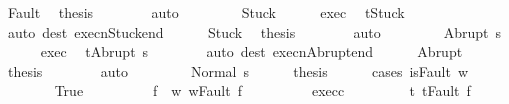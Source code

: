 \begin{isabellebody}
\ Fault\ \isamarkupfalse%
\ {\isacharquery}thesis\isanewline
\ \ \ \ \ \ \isamarkupfalse%
\ auto\isanewline
\ \ \isamarkupfalse%
\isanewline
\ \ \ \ \isamarkupfalse%
\ Stuck\isanewline
\ \ \ \ \isamarkupfalse%
\ exec\ \isamarkupfalse%
\ {\isachardoublequoteopen}t{\isacharequal}Stuck{\isachardoublequoteclose}\isanewline
\ \ \ \ \ \ \isamarkupfalse%
\ {\isacharparenleft}auto\ dest{\isacharcolon}\ execn{\isacharunderscore}Stuck{\isacharunderscore}end{\isacharparenright}\isanewline
\ \ \ \ \isamarkupfalse%
\ Stuck\ \isamarkupfalse%
\ {\isacharquery}thesis\isanewline
\ \ \ \ \ \ \isamarkupfalse%
\ auto\isanewline
\ \ \isamarkupfalse%
\isanewline
\ \ \ \ \isamarkupfalse%
\ {\isacharparenleft}Abrupt\ s{\isacharprime}{\isacharparenright}\isanewline
\ \ \ \ \isamarkupfalse%
\ exec\ \isamarkupfalse%
\ {\isachardoublequoteopen}t{\isacharequal}Abrupt\ s{\isacharprime}{\isachardoublequoteclose}\isanewline
\ \ \ \ \ \ \isamarkupfalse%
\ {\isacharparenleft}auto\ dest{\isacharcolon}\ execn{\isacharunderscore}Abrupt{\isacharunderscore}end{\isacharparenright}\isanewline
\ \ \ \ \isamarkupfalse%
\ Abrupt\ \isamarkupfalse%
\ {\isacharquery}thesis\isanewline
\ \ \ \ \ \ \isamarkupfalse%
\ auto\isanewline
\ \ \isamarkupfalse%
\isanewline
\ \ \ \ \isamarkupfalse%
\ {\isacharparenleft}Normal\ s{\isacharprime}{\isacharparenright}\isanewline
\ \ \ \ \isamarkupfalse%
\ {\isacharquery}thesis\isanewline
\ \ \ \ \isamarkupfalse%
\ {\isacharparenleft}cases\ {\isachardoublequoteopen}isFault\ w{\isachardoublequoteclose}{\isacharparenright}\isanewline
\ \ \ \ \ \ \isamarkupfalse%
\ True\isanewline
\ \ \ \ \ \ \isamarkupfalse%
\ \isamarkupfalse%
\ f\ \ w{\isacharprime}{\isacharcolon}\ {\isachardoublequoteopen}w{\isacharequal}Fault\ f{\isachardoublequoteclose}\isacommand{{\isachardot}{\isachardot}}\isamarkupfalse%
\isanewline
\ \ \ \ \ \ \isamarkupfalse%
\ \isamarkupfalse%
\ exec{\isacharunderscore}c{}\ \isanewline
\ \ \ \ \ \ \isamarkupfalse%
\ t{\isacharcolon}\ {\isachardoublequoteopen}t{\isacharequal}Fault\ f{\isachardoublequoteclose}\isanewline
\ \ \ \ \ \ \ \ \isamarkupfalse%

\end{isabellebody}
